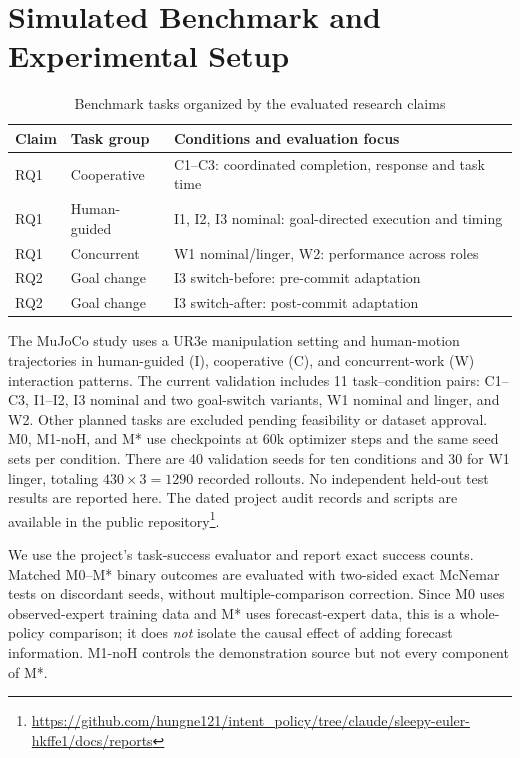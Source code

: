 \documentclass[conference]{IEEEtran}
\begin{document}
\section{Simulated Benchmark and Experimental Setup}
\begin{table}[t]
\caption{Benchmark tasks organized by the evaluated research claims}
\label{tab:benchmark}
\centering\footnotesize
\begin{tabular}{p{}p{}p{}}
\toprule
Claim & Task group & Conditions and evaluation focus\\
\midrule
RQ1 & Cooperative & C1--C3: coordinated completion, response and task time\\
RQ1 & Human-guided & I1, I2, I3 nominal: goal-directed execution and timing\\
RQ1 & Concurrent & W1 nominal/linger, W2: performance across roles\\
RQ2 & Goal change & I3 switch-before: pre-commit adaptation\\
RQ2 & Goal change & I3 switch-after: post-commit adaptation\\
\bottomrule
\end{tabular}
\end{table}

The MuJoCo study uses a UR3e manipulation setting and human-motion trajectories in human-guided (I), cooperative (C), and concurrent-work (W) interaction patterns. The current validation includes 11 task--condition pairs: C1--C3, I1--I2, I3 nominal and two goal-switch variants, W1 nominal and linger, and W2. Other planned tasks are excluded pending feasibility or dataset approval. M0, M1-noH, and M* use checkpoints at 60k optimizer steps and the same seed sets per condition. There are 40 validation seeds for ten conditions and 30 for W1 linger, totaling $430\times3=1290$ recorded rollouts. No independent held-out test results are reported here. The dated project audit records and scripts are available in the public repository\footnote{\url{https://github.com/hungne121/intent_policy/tree/claude/sleepy-euler-hkffe1/docs/reports}}.

We use the project's task-success evaluator and report exact success counts. Matched M0--M* binary outcomes are evaluated with two-sided exact McNemar tests on discordant seeds, without multiple-comparison correction. Since M0 uses observed-expert training data and M* uses forecast-expert data, this is a whole-policy comparison; it does \emph{not} isolate the causal effect of adding forecast information. M1-noH controls the demonstration source but not every component of M*.
\end{document}
